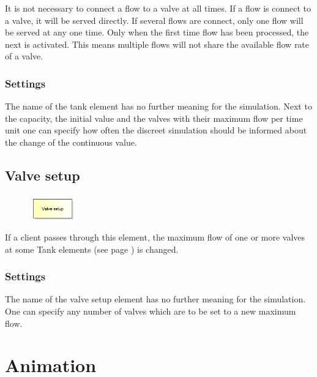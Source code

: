 It is not necessary to connect a flow to a valve at all times.
If a flow is connect to a valve, it will be served directly.
If several flows are connect, only one flow will be served at any one time.
Only when the first time flow has been processed, the next is activated.
This means multiple flows will not share the available flow rate of a valve.

\subsection*{Settings}

The name of the tank element has no further meaning for the simulation.
Next to the capacity, the initial value and the valves with their maximum flow per time unit
one can specify how often the discreet simulation should be informed about the change of
the continuous value.


\section{Valve setup}
\label{ref:ModelElementTankValveSetup}

\begin{figure}
\vspace{-22pt}
\includegraphics[width=2cm]{imageModelElementTankValveSetup.png}
\vspace{-22pt}
\end{figure}

If a client passes through this element, the maximum flow of one or more valves
at some Tank elements (see page \pageref{ref:ModelElementTank}) is changed.

\subsection*{Settings}

The name of the valve setup element has no further meaning for the simulation.
One can specify any number of valves which are to be set to a new maximum flow.





\chapter{Animation}

